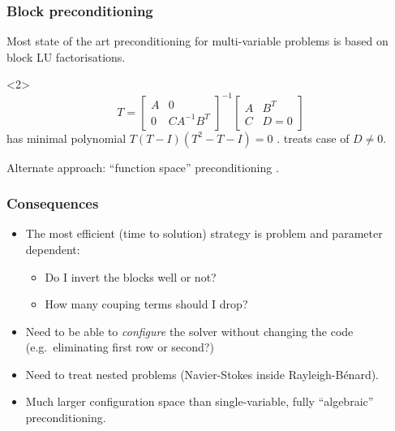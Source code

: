 \documentclass[presentation]{beamer}
\begin{document}
\begin{frame}
  \frametitle{Block preconditioning}
  Most state of the art preconditioning for multi-variable
  problems is based on block LU factorisations.

  \begin{uncoverenv}<2>
    \begin{equation*}
      T = \begin{bmatrix}
        A & 0 \\
        0 & C A^{-1} B^T
      \end{bmatrix}^{-1}
      \begin{bmatrix}
        A & B^T \\
        C & D = 0
      \end{bmatrix}
    \end{equation*}
    has minimal polynomial $T(T - I)(T^2 - T - I) =
    0$ \parencite{Murphy:2000}. \textcite{Ipsen:2001} treats case of
    $D \ne 0$.

    Alternate approach: ``function space''
    preconditioning \parencite{Kirby:2010,Mardal:2011,Malek:2014}.
  \end{uncoverenv}
\end{frame}

\begin{frame}
  \frametitle{Consequences}
  \begin{itemize}
  \item The most efficient (time to solution) strategy is problem and
    parameter dependent:
    \begin{itemize}
    \item Do I invert the blocks well or not?
    \item How many couping terms should I drop?
    \end{itemize}
  \item Need to be able to \emph{configure} the solver without
    changing the code (e.g.~eliminating first row or second?)
  \item Need to treat nested problems (Navier-Stokes inside
    Rayleigh-B\'enard).
  \item Much larger configuration space than single-variable, fully
    ``algebraic'' preconditioning.
  \end{itemize}
\end{frame}
\end{document}
